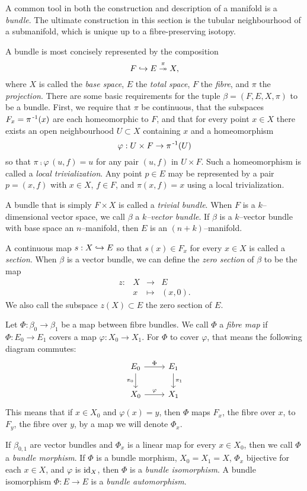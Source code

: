 A common tool in both the construction and description of a manifold is a \emph{bundle}.
The ultimate construction in this section is the tubular neighbourhood of a submanifold, which is unique up to a fibre-preserving isotopy.

\begin{defn}[Bundle]
	A bundle is most concisely represented by the composition
	\[
		F\hookrightarrow E\overset{\pi}{\twoheadrightarrow} X,
	\]
	where $X$ is called the \emph{base space}, $E$ the \emph{total space}, $F$ the \emph{fibre}, and $\pi$ the \emph{projection}.
	There are some basic requirements for the tuple $\beta = (F,E,X,\pi)$ to be a bundle.
	First, we require that $\pi$ be continuous, that the subspaces $F_x = \pi^{\,\text{-}1}(x)$ are each homeomorphic to $F$, and that for every point $x\in X$ there exists an open neighbourhood $U\subset X$ containing $x$ and a homeomorphism
	\[
		\varphi: U\times F\to \pi^{\,\text{-}1}(U)
	\]
	so that $\pi\comp\varphi\,(u,f)=u$ for any pair $(u,f)$ in $U\times F$.
	Such a homeomorphism is called a \emph{local trivialization}.
	Any point $p\in E$ may be represented by a pair $p=(x,f)$ with $x\in X$, $f\in F$, and $\pi(x,f)=x$ using a local trivialization.
	
	A bundle that is simply $F\times X$ is called a \emph{trivial bundle}.
	When $F$ is a $k$--dimensional vector space, we call $\beta$ a \emph{$k$--vector bundle}.
	If $\beta$ is a $k$--vector bundle with base space an $n$--manifold, then $E$ is an $(n+k)$--manifold.
	
	A continuous map $s:X\hookrightarrow E$ so that $s(x)\in F_x$ for every $x\in X$ is called a \emph{section}.
	When $\beta$ is a vector bundle, we can define the \emph{zero section} of $\beta$ to be the map
	\[
		\begin{array}{cccc}
			z: & X & \to 	 & E \\
			   & x & \mapsto & (x,0).
		\end{array}
	\]
	We also call the subspace $z(X)\subset E$ the zero section of $E$.
\end{defn}

\begin{defn}
	Let $\Phi:\beta_0\to \beta_1$ be a map between fibre bundles.
	We call $\Phi$ a \emph{fibre map} if $\Phi:E_0\to E_1$ covers a map $\varphi:X_0\to X_1$.
	For $\Phi$ to cover $\varphi$, that means the following diagram commutes:
	\[
		\begin{tikzcd}
			E_0 \arrow{r}{\Phi} \arrow[swap]{d}{\pi_0} & E_1 \arrow{d}{\pi_1} \\
			X_0 \arrow{r}{\varphi} & X_1
		\end{tikzcd}
	\]
	This means that if $x\in X_0$ and $\varphi(x)=y$, then $\Phi$ maps $F_x$, the fibre over $x$, to $F_y$, the fibre over $y$, by a map we will denote $\Phi_x$.

	If $\beta_{0,1}$ are vector bundles and $\Phi_x$ is a linear map for every $x\in X_0$, then we call $\Phi$ a \emph{bundle morphism}.
	If $\Phi$ is a bundle morphism, $X_0=X_1=X$, $\Phi_x$ bijective for each $x\in X$, and $\varphi$ is $\textrm{id}_{X}$, then $\Phi$ is a \emph{bundle isomorphism}.
	A bundle isomorphism $\Phi:E\to E$ is a \emph{bundle automorphism}.
\end{defn}

